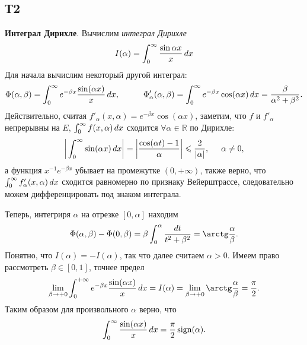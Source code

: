 \subsection{Т2}

\textbf{Интеграл Дирихле}. Вычислим \textit{интеграл Дирихле}
\begin{equation}
    I(\alpha) = \int_0^\infty \frac{\sin \alpha x}{x} \, d x
\end{equation}
Для начала вычислим некоторый другой интеграл:
\begin{equation*}
    \Phi(\alpha, \beta) = \int_0^{\infty} e^{-\beta x} \frac{\sin (\alpha x)}{x} \d x,
    \hspace{10 mm}
    \Phi'_\alpha (\alpha, \beta) = 
    \int_0^\infty e^{-\beta x} \cos (\alpha x) \d x = \frac{\beta}{\alpha^2 + \beta^2}.
\end{equation*}
Действительно, считая $f'_\alpha (x, \alpha) = e^{-\beta x} \cos (\alpha x)$, заметим, что $f$ и $f'_\alpha$ непрерывны на $E$, $\int_0^{\infty} f(x, \alpha) \, d x$ сходится $\forall \alpha \in \mathbb{R}$ по Дирихле:
\begin{equation*}
    \bigg|
        \int_0^{\infty} \sin (\alpha x) \, d x
    \bigg| = \bigg|
        \frac{\cos (\alpha t) - 1}{\alpha}
    \bigg| \leqslant \frac{2}{|\alpha|}, \hspace{5 mm} \alpha \neq 0,
\end{equation*}
а функция $x^{-1} e^{-\beta x}$ убывает на промежутке $(0, +\infty)$, также верно, что $\int_0^{\infty} f'_\alpha (x, \alpha) \, d x$ сходится равномерно по признаку Вейерштрассе, следовательно можем дифференцировать под знаком интеграла. 

Теперь, интегриря $\alpha$ на отрезке $[0, \alpha]$ находим
\begin{equation*}
    \Phi(\alpha, \beta) - \Phi(0, \beta) = \beta \int_{0}^{\alpha} \frac{d t}{t^2 + \beta^2} = 
    \arctg \frac{\alpha}{\beta} 
    .
\end{equation*}
Понятно, что $I(\alpha) = - I(\alpha)$, так что далее считаем $\alpha > 0$. Имеем право рассмотреть $\beta \in [0, 1]$, точнее предел
\begin{equation*}
    \lim_{\beta \to +0} \int_0^{+\infty} e^{-\beta x} \frac{\sin(\alpha x)}{x} \d x = I(\alpha) =
    \lim_{\beta \to +0} \arctg \frac{\alpha}{\beta} = \frac{\pi}{2}.
\end{equation*}
Таким образом для произвольного $\alpha$ верно, что
\begin{equation}
    \int_0^{\infty} \frac{\sin(\alpha x)}{x} \, d x = \frac{\pi}{2} \mathop{\mathrm{sign}}\nolimits (\alpha).
\end{equation}

